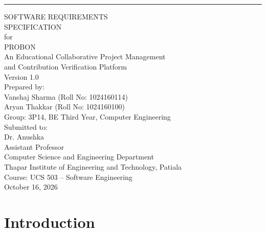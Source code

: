 \documentclass{scrreprt}
\def\myversion{1.0}
\begin{document}
\begin{titlepage}
\begin{flushright}
    \rule{\linewidth}{4pt}\vskip0.8cm
    \begin{bfseries}
        \Huge{SOFTWARE REQUIREMENTS\\ SPECIFICATION}\\[0.6cm]
        \Large{for}\\[0.6cm]
        \Huge{PROBON}\\[0.3cm]
        \large{An Educational Collaborative Project Management\\ and Contribution Verification Platform}\\[0.8cm]
        \LARGE{Version \myversion}\\[0.9cm]
        \normalsize
        Prepared by:\\[0.2cm]
        Vanshaj Sharma (Roll No: 1024160114)\\
        Aryan Thakkar (Roll No: 1024160100)\\[0.4cm]
        Group: 3P14, BE Third Year, Computer Engineering\\[0.8cm]
        Submitted to:\\[0.2cm]
        Dr. Anushka\\
        Assistant Professor\\
        Computer Science and Engineering Department\\
        Thapar Institute of Engineering and Technology, Patiala\\[0.8cm]
        Course: UCS 503 -- Software Engineering\\[0.8cm]
        October 16, 2026
    \end{bfseries}
\end{flushright}
\end{titlepage}

\tableofcontents

\chapter{Introduction}\label{chap:introduction}
\end{document}
